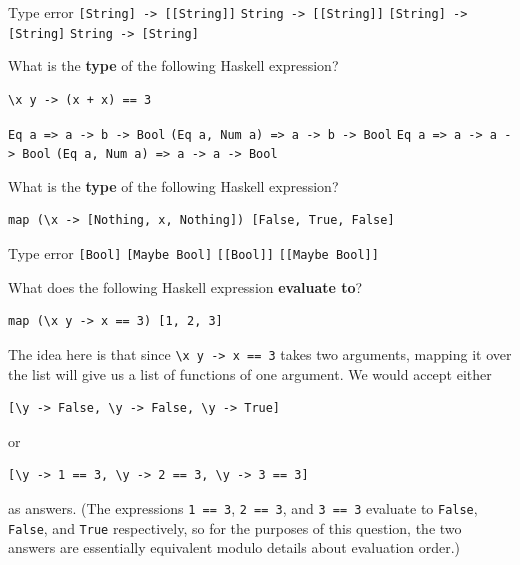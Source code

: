\documentclass[addpoints]{exam}
\begin{document}
\begin{questions}
\begin{checkboxes}
  \choice Type error
  \CorrectChoice \texttt{[String] -> [[String]]}
  \choice \texttt{String -> [[String]]}
  \choice \texttt{[String] -> [String]}
  \choice \texttt{String -> [String]}
\end{checkboxes}

\newpage

\question[4] What is the \textbf{type} of the following Haskell expression?

\begin{verbatim}
\x y -> (x + x) == 3
\end{verbatim}

\begin{checkboxes}
  \choice \texttt{Eq a => a -> b -> Bool}
  \CorrectChoice \texttt{(Eq a, Num a) => a -> b -> Bool}
  \choice \texttt{Eq a => a -> a -> Bool}
  \choice \texttt{(Eq a, Num a) => a -> a -> Bool}
\end{checkboxes}

\question[4] What is the \textbf{type} of the following Haskell expression?

\begin{verbatim}
map (\x -> [Nothing, x, Nothing]) [False, True, False]
\end{verbatim}

\begin{checkboxes}
  \CorrectChoice Type error
  \choice \texttt{[Bool]}
  \choice \texttt{[Maybe Bool]}
  \choice \texttt{[[Bool]]}
  \choice \texttt{[[Maybe Bool]]}
\end{checkboxes}

\question[5] What does the following Haskell expression \textbf{evaluate to}?

\begin{verbatim}
map (\x y -> x == 3) [1, 2, 3]
\end{verbatim}

\begin{solutionorbox}[1.25in]
The idea here is that since \verb|\x y -> x == 3| takes two arguments, mapping it over the list will give us a list of functions of one argument.  We would accept either
\begin{verbatim}
[\y -> False, \y -> False, \y -> True]
\end{verbatim}
or
\begin{verbatim}
[\y -> 1 == 3, \y -> 2 == 3, \y -> 3 == 3]
\end{verbatim}
as answers.  (The expressions \verb|1 == 3|, \verb|2 == 3|, and \verb|3 == 3| evaluate to \verb|False|, \verb|False|, and \verb|True| respectively, so for the purposes of this question, the two answers are essentially equivalent modulo details about evaluation order.)
\end{solutionorbox}


\end{questions}
\end{document}
